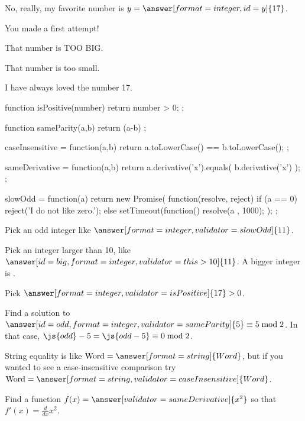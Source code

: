 \documentclass{ximera}
\begin{document}
\begin{problem}
  No, really, my favorite number is $y = \answer[format=integer,id=y]{17}$.

  \begin{feedback}[attempt]
    You made a first attempt!
  \end{feedback}

  \begin{feedback}[y>17]
    That number is TOO BIG.
  \end{feedback}

  \begin{feedback}[y<17]
    That number is too small.
  \end{feedback}

  \begin{feedback}[correct]
    I have always loved the number 17.
  \end{feedback}
\end{problem}



\begin{javascript}
  function isPositive(number) {
    return number > 0;
  };

  function sameParity(a,b) {
    return (a-b)%
  };

  caseInsensitive = function(a,b) {
    return a.toLowerCase() == b.toLowerCase();
  };

  sameDerivative = function(a,b) {
    return a.derivative('x').equals( b.derivative('x') );
  };

  slowOdd = function(a) {
    return new Promise( function(resolve, reject) {
      if (a == 0)
        reject('I do not like zero.');
      else
        setTimeout(function(){
          resolve(a %
        }, 1000);      
    });
  };  
\end{javascript}

\begin{problem}
  Pick an odd integer like $\answer[format=integer,validator=slowOdd]{11}$.
\end{problem}

\begin{problem}
  Pick an integer larger than 10, like $\answer[id=big,format=integer,validator=this>10]{11}$.  A bigger integer is .

  Pick $\answer[format=integer,validator=isPositive]{17} > 0$.

  Find a solution to $\answer[id=odd,format=integer,validator=sameParity]{5} \equiv 5 \bmod 2$.  In that case, $\js{odd} - 5 = \js{odd-5} \equiv 0 \bmod 2$.

  String equality is like $\mbox{Word} = \answer[format=string]{Word}$, but if you wanted to see a case-insensitive comparison try $\mbox{Word} = \answer[format=string,validator=caseInsensitive]{Word}$.

  Find a function $f(x) = \answer[validator=sameDerivative]{x^2}$ so that $f'(x) = \frac{d}{dx} x^2$.
\end{problem}
\end{document}
